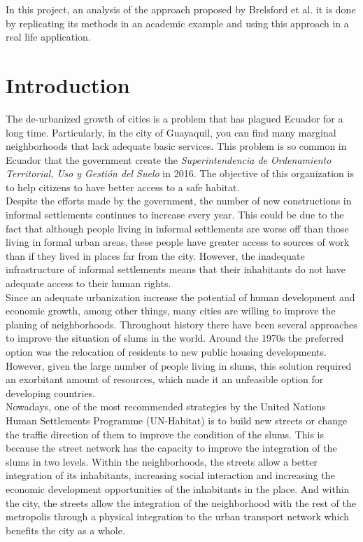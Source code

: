 \documentclass[10pt]{article}
\begin{document}
In this project, an analysis of the approach proposed by Brelsford et al. it is done by replicating its methods in an academic example and using this approach in a real life application.

\newpage
\section{Introduction}

The de-urbanized growth of cities is a problem that has plagued Ecuador for a long time. Particularly, in the city of Guayaquil, you can find many marginal neighborhoods that lack adequate basic services\cite{miduvi}. This problem is so common in Ecuador that the government create the \emph{Superintendencia de Ordenamiento Territorial, Uso y Gestión del Suelo} in 2016. The objective of this organization is to help citizens to have better access to a safe habitat\cite{sot}.\\

Despite the efforts made by the government, the number of new constructions in informal settlements continues to increase every year. This could be due to the fact that although people living in informal settlements are worse off than those living in formal urban areas, these people have greater access to sources of work than if they lived in places far from the city\cite{turok2018theory}. However, the inadequate infrastructure of informal settlements means that their inhabitants do not have adequate access to their human rights\cite{bennett20185}.\\

Since an adequate urbanization increase the potential of human development and economic growth, among other things, many cities are willing to improve the planing of neighborhoods. Throughout history there have been several approaches to improve the situation of slums in the world. Around the 1970s the preferred option was the relocation of residents to new public housing developments. However, given the large number of people living in slums, this solution required an exorbitant amount of resources, which made it an unfeasible option for developing countries\cite{unh}.\\

Nowadays, one of the most recommended strategies by the United Nations Human Settlements Programme (UN-Habitat) is to build new streets or change the traffic direction of them to improve the condition of the slums\cite{unh}. This is because the street network has the capacity to improve the integration of the slums in two levels. Within the neighborhoods, the streets allow a better integration of its inhabitants, increasing social interaction and increasing the economic development opportunities of the inhabitants in the place. And within the city, the streets allow the integration of the neighborhood with the rest of the metropolis through a physical integration to the urban transport network which benefits the city as a whole\cite{unh}.\\
\end{document}
